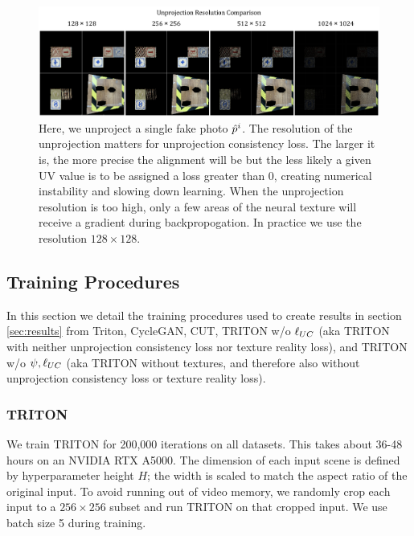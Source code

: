 	\begin{figure}[H]
		\begin{center}
			\includegraphics[width=400pt]{../images/unprojection_resolution_comparison.pdf}
		\end{center}
		\caption{
			Here, we unproject a single fake photo $\hat{p}^i$. The resolution of the unprojection matters for unprojection consistency loss. The larger it is, the more precise the alignment will be but the less likely a given UV value is to be assigned a loss greater than 0, creating numerical instability and slowing down learning. 
			When the unprojection resolution is too high, only a few areas of the neural texture will receive a gradient during backpropogation. In practice we use the resolution $128\times128$.
		}
		\label{fig:unprojection_resolution_comparison}
	\end{figure}

\subsection{Training Procedures}

	In this section we detail the training procedures used to create results in section \ref{sec:results} from Triton, CycleGAN, CUT,
		TRITON w/o $\ell_{UC}$ (aka TRITON with neither unprojection consistency loss nor texture reality loss), and
		TRITON w/o $\psi, \ell_{UC}$ (aka TRITON without textures, and therefore also without unprojection consistency loss or texture reality loss).

	\subsubsection{TRITON}
	\label{par:triton}
	We train TRITON for 200,000 iterations on all datasets. This takes about 36-48 hours on an NVIDIA RTX A5000. 
	The dimension of each input scene is defined by hyperparameter height $H$; the width is scaled to match the aspect ratio of the original input.
	To avoid running out of video memory, we randomly crop each input to a $256\times256$ subset and run TRITON on that cropped input.
	We use batch size 5 during training.
	
